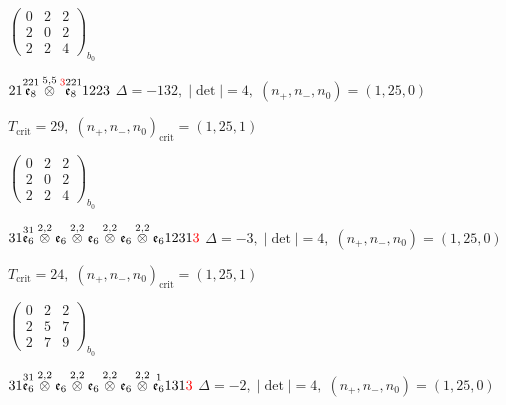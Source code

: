 \documentclass[10pt]{article}
\begin{document}
\hspace{2em}$\left(\begin{smallmatrix}0 & 2 & 2 \\ 2 & 0 & 2 \\ 2 & 2 & 4\end{smallmatrix}\right)_{\!b_0}$

\smallskip

$21\overset{221}{\mathfrak{e}_8}\overset{5,5}{\otimes}\overset{\textcolor{red}{3}221}{\mathfrak{e}_8}1223$ \quad $\Delta=-132,\; |\det|=4,\; (n_+,n_-,n_0)=(1,25,0)$

\hspace{1em}$T_{\text{crit}}=29,\; (n_+,n_-,n_0)_{\text{crit}}=(1,25,1)$

\hspace{2em}$\left(\begin{smallmatrix}0 & 2 & 2 \\ 2 & 0 & 2 \\ 2 & 2 & 4\end{smallmatrix}\right)_{\!b_0}$

\smallskip

$31\overset{31}{\mathfrak{e}_6}\overset{2,2}{\otimes}\mathfrak{e}_6\overset{2,2}{\otimes}\mathfrak{e}_6\overset{2,2}{\otimes}\mathfrak{e}_6\overset{2,2}{\otimes}\mathfrak{e}_61231\textcolor{red}{3}$ \quad $\Delta=-3,\; |\det|=4,\; (n_+,n_-,n_0)=(1,25,0)$

\hspace{1em}$T_{\text{crit}}=24,\; (n_+,n_-,n_0)_{\text{crit}}=(1,25,1)$

\hspace{2em}$\left(\begin{smallmatrix}0 & 2 & 2 \\ 2 & 5 & 7 \\ 2 & 7 & 9\end{smallmatrix}\right)_{\!b_0}$

\smallskip

$31\overset{31}{\mathfrak{e}_6}\overset{2,2}{\otimes}\mathfrak{e}_6\overset{2,2}{\otimes}\mathfrak{e}_6\overset{2,2}{\otimes}\mathfrak{e}_6\overset{2,2}{\otimes}\overset{1}{\mathfrak{e}_6}131\textcolor{red}{3}$ \quad $\Delta=-2,\; |\det|=4,\; (n_+,n_-,n_0)=(1,25,0)$
\end{document}
